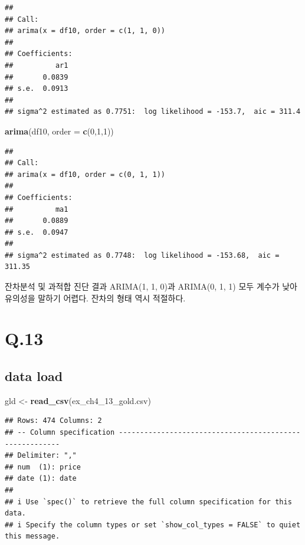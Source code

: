 \documentclass[
]{article}
\newenvironment{Shaded}{\begin{snugshade}}{\end{snugshade}}
\newcommand{\AttributeTok}[1]{\textcolor[rgb]{0.13,0.29,0.53}{#1}}
\newcommand{\DecValTok}[1]{\textcolor[rgb]{0.00,0.00,0.81}{#1}}
\newcommand{\FunctionTok}[1]{\textcolor[rgb]{0.13,0.29,0.53}{\textbf{#1}}}
\newcommand{\NormalTok}[1]{#1}
\newcommand{\OtherTok}[1]{\textcolor[rgb]{0.56,0.35,0.01}{#1}}
\newcommand{\StringTok}[1]{\textcolor[rgb]{0.31,0.60,0.02}{#1}}
\begin{document}
\begin{verbatim}
## 
## Call:
## arima(x = df10, order = c(1, 1, 0))
## 
## Coefficients:
##          ar1
##       0.0839
## s.e.  0.0913
## 
## sigma^2 estimated as 0.7751:  log likelihood = -153.7,  aic = 311.4
\end{verbatim}

\begin{Shaded}
\begin{Highlighting}[]
\FunctionTok{arima}\NormalTok{(df10, }\AttributeTok{order =} \FunctionTok{c}\NormalTok{(}\DecValTok{0}\NormalTok{,}\DecValTok{1}\NormalTok{,}\DecValTok{1}\NormalTok{))}
\end{Highlighting}
\end{Shaded}

\begin{verbatim}
## 
## Call:
## arima(x = df10, order = c(0, 1, 1))
## 
## Coefficients:
##          ma1
##       0.0889
## s.e.  0.0947
## 
## sigma^2 estimated as 0.7748:  log likelihood = -153.68,  aic = 311.35
\end{verbatim}

잔차분석 및 과적합 진단 결과 ARIMA(1, 1, 0)과 ARIMA(0, 1, 1) 모두 계수가
낮아 유의성을 말하기 어렵다. 잔차의 형태 역시 적절하다.

\section{Q.13}\label{q.13}

\subsection{data load}\label{data-load-1}

\begin{Shaded}
\begin{Highlighting}[]
\NormalTok{gld }\OtherTok{\textless{}{-}} \FunctionTok{read\_csv}\NormalTok{(}\StringTok{\textquotesingle{}ex\_ch4\_13\_gold.csv\textquotesingle{}}\NormalTok{)}
\end{Highlighting}
\end{Shaded}

\begin{verbatim}
## Rows: 474 Columns: 2
## -- Column specification --------------------------------------------------------
## Delimiter: ","
## num  (1): price
## date (1): date
## 
## i Use `spec()` to retrieve the full column specification for this data.
## i Specify the column types or set `show_col_types = FALSE` to quiet this message.
\end{verbatim}
\end{document}
